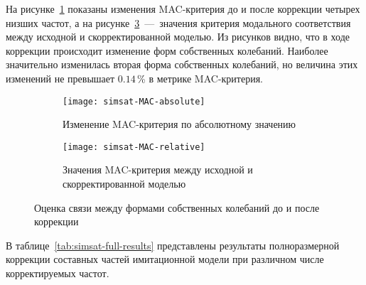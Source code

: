 На рисунке~\ref{subfig:simsat-MAC-absolute} показаны изменения MAC-критерия до и после коррекции четырех низших частот, а на рисунке~\ref{subfig:simsat-MAC-relative}~---~значения критерия модального соответствия между исходной и скорректированной моделью. Из рисунков видно, что в ходе коррекции происходит изменение форм собственных колебаний. Наиболее значительно изменилась вторая форма собственных колебаний, но величина этих изменений не превышает $ 0.14 $\,\% в метрике MAC-критерия.

\begin{figure}[!htb]
	\centering
	\begin{subfigure}[t]{0.49\textwidth}
		\centering
		\texttt{[image: simsat-MAC-absolute]}
		\caption{Изменение MAC-критерия по абсолютному значению} \label{subfig:simsat-MAC-absolute}
	\end{subfigure}
	\hfill
	\begin{subfigure}[t]{0.49\textwidth}
		\centering
		\texttt{[image: simsat-MAC-relative]}
		\caption{Значения MAC-критерия между исходной и скорректированной моделью} \label{subfig:simsat-MAC-relative}
	\end{subfigure}	
	\caption{Оценка связи между формами собственных колебаний до и после коррекции} 
\end{figure}

В таблице~\ref{tab:simsat-full-results} представлены результаты полноразмерной коррекции составных частей имитационной модели при различном числе корректируемых частот. 

